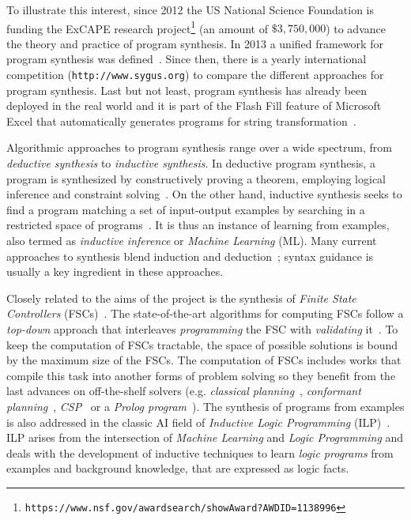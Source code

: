 \documentclass[10pt,a4paper]{paper}
\begin{document}
To illustrate this interest, since 2012 the {\sc US National Science Foundation} is funding the ExCAPE research project\footnote{\tt https://www.nsf.gov/awardsearch/showAward?AWD\textunderscore ID=1138996} (an amount of $\$3,750,000$) to advance the theory and practice of program synthesis. In 2013 a unified framework for program synthesis was defined~\cite{alur2013syntax}. Since then, there is a yearly international competition ({\tt http://www.sygus.org}) to compare the different approaches for program synthesis. Last but not least, program synthesis has already been deployed in the real world and it is part of the {\sc Flash Fill} feature of {\sc Microsoft Excel} that automatically generates programs for string transformation~\cite{gulwani2011automating}.

Algorithmic approaches to program synthesis range over a wide spectrum, from {\em deductive synthesis} to {\em inductive synthesis}. In deductive program synthesis, a program is synthesized by constructively proving a theorem, employing logical inference and constraint solving~\cite{manna1986deductive}. On the other hand, inductive synthesis seeks to find a program matching a set of input-output examples by searching in a restricted space of programs~\cite{summers1977methodology,shapiro1983algorithmic}. It is thus an instance of learning from examples, also termed as {\em inductive inference} or {\em Machine Learning} (ML). Many current approaches to synthesis blend induction and deduction~\cite{seshia2015combining}; syntax guidance is usually a key ingredient in these approaches. 

Closely related to the aims of the project is the synthesis of {\it Finite State Controllers} (FSCs)~\cite{geffner:policies:IJCAI15}. The state-of-the-art algorithms for computing FSCs follow a {\it top-down} approach that interleaves {\it programming} the FSC with {\em validating} it~\cite{sergio:aprograming:ijcai16,segovia:FSC:JAIR2018}. To keep the computation of FSCs tractable, the space of possible solutions is bound by the maximum size of the FSCs. The computation of FSCs includes works that compile this task into another forms of problem solving so they benefit from the last advances on off-the-shelf solvers (e.g. {\em classical planning}~\cite{sergio:aprograming:icaps16}, {\em conformant planning}~\cite{Geffner:FSM:AAAI10}, {\em CSP}~\cite{Infantes:FSC:ECAI2010} or a {\em Prolog program}~\cite{Giacomo:FSM:ICAPS13}). The synthesis of programs from examples is also addressed in the classic AI field of {\em Inductive Logic Programming} (ILP)~\cite{muggleton1991inductive,Raedt:relationalML:book2008}. ILP arises from the intersection of {\em Machine Learning} and {\em Logic Programming} and deals with the development of inductive techniques to learn {\em logic programs} from examples and background knowledge, that are expressed as logic facts.
\end{document}
